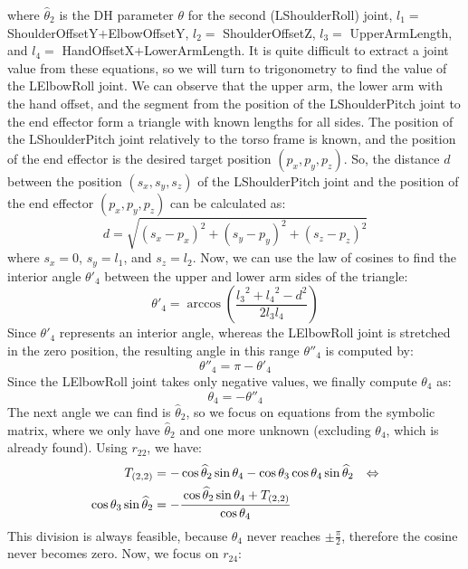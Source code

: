 where $\widehat{\theta}_2$ is the DH parameter $\theta$ for the second (LShoulderRoll) joint, $l_1 =$ ShoulderOffsetY$+$ElbowOffsetY, $l_2 =$ ShoulderOffsetZ, $l_3 =$ UpperArmLength, and $l_4 =$ HandOffsetX$+$LowerArmLength.
It is quite difficult to extract a joint value from these equations, so we will turn to trigonometry to find the value of the LElbowRoll joint. We can observe that the upper arm, the lower arm with the hand offset, and the segment from the position of the LShoulderPitch joint to the end effector form a triangle with known lengths for all sides. The position of the LShoulderPitch joint relatively to the torso frame is known, and the position of the end effector is the desired target position $(p_x,p_y,p_z)$. So, the distance $d$ between the position $(s_x,s_y,s_z)$ of the LShoulderPitch joint and the position of the end effector $(p_x,p_y,p_z)$ can be calculated as:
\[
d=\sqrt{\left(s_x-p_x\right)^2 + \left(s_y-p_y\right)^2 + \left(s_z-p_z\right)^2}
\]
where $s_x = 0$, $s_y = l_1$, and $s_z = l_2$.
Now, we can use the law of cosines to find the interior angle $\theta'_4$ between the upper and lower arm sides of the triangle:
\[
\theta'_4 = \arccos\left(\frac{{l_3}^2 + {l_4}^2 - d^2}{2l_3l_4}\right)
\]
Since $\theta'_4$ represents an interior angle, whereas the LElbowRoll joint is stretched in the zero position, the resulting angle in this range $\theta''_4$ is computed by:
\[
\theta''_4 = \pi - \theta'_4
\]
Since the LElbowRoll joint takes only negative values, we finally compute $\theta_4$ as:
\[
\theta_4 = - \theta''_4
\]
The next angle we can find is $\widehat{\theta}_2$, so we focus on equations from the symbolic matrix, where we only have $\widehat{\theta}_2$ and one more unknown (excluding $\theta_4$, which is already found). Using $r_{22}$, we have:
\begin{align*}
T_{(2,2)} &= -\cos\widehat{\theta}_2\sin\theta_4 - \cos\theta_3\cos\theta_4\sin\widehat{\theta}_2 &\Leftrightarrow\\
\cos\theta_3\sin\widehat{\theta}_2 &= -\cfrac{\cos\widehat{\theta}_2\sin\theta_4 + T_{(2,2)}}{\cos\theta_4}
\end{align*}
This division is always feasible, because $\theta_4$ never reaches $\pm\frac{\pi}{2}$, therefore the cosine never becomes zero. Now, we focus on $r_{24}$:
